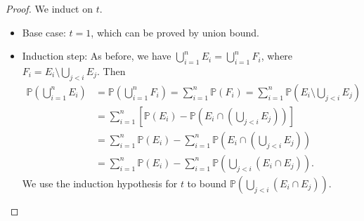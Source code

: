 \begin{proof}
    We induct on \(t\). 
    \begin{itemize}
        \item Base case: \(t = 1\), which can be proved by union bound. 
        \item Induction step: As before, we have \(\bigcup_{i=1}^{n} E_i = \bigcup_{i=1}^{n} F_i\), where \(F_i = E_i \setminus \bigcup_{j < i} E_j \). Then 
        \begin{align*}
            \mathbb{P} \left( \bigcup_{i=1}^{n} E_i  \right) &= \mathbb{P} \left( \bigcup_{i=1}^{n} F_i  \right) = \sum_{i=1}^n \mathbb{P} (F_i) = \sum_{i=1}^n \mathbb{P}\left( E_i \setminus \bigcup_{j < i} E_j  \right) \\ &= \sum_{i=1}^n \left[ \mathbb{P} (E_i) - \mathbb{P} \left( E_i \cap \left( \bigcup_{j < i} E_j  \right)  \right)  \right] \\
            &= \sum_{i=1}^n \mathbb{P} (E_i) - \sum_{i=1}^n \mathbb{P} \left( E_i \cap \left( \bigcup_{j < i} E_j  \right)  \right) \\
            &= \sum_{i=1}^n \mathbb{P} (E_i) - \sum_{i=1}^n \mathbb{P} \left( \bigcup_{j < i} (E_i \cap E_j)  \right).              
        \end{align*}
        We use the induction hypothesis for \(t\) to bound \(\mathbb{P} \left( \bigcup_{j < i} (E_i \cap E_j)  \right) \). 


\end{itemize}
\end{proof}
